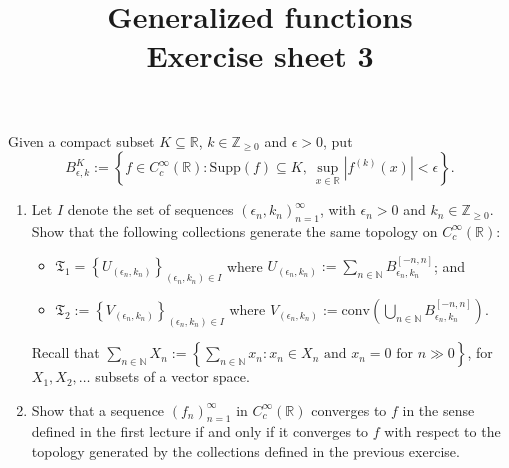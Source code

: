 \documentclass[11pt, reqno,a4paper, twoside]{amsproc}
\title{Generalized functions\\Exercise sheet 3}
\newcommand{\supp}{\mathrm{Supp}}
\newcommand{\dbN}{\mathbb N}
\newcommand{\dbZ}{\mathbb Z}
\newcommand{\dbR}{\mathbb R}
\newcommand{\set}[1]{\left\{{#1}\right\}}
\newcommand{\abs}[1]{\left|#1\right|}
\newcommand{\mfr}{\mathfrak}
\begin{document}
\maketitle

\subsection{}
Given a compact subset $K\subseteq\dbR$, $k\in\dbZ_{\ge 0}$ and $\epsilon>0$, put \[B^K_{\epsilon,k}:=\set{f\in C^\infty_c(\dbR):\supp(f)\subseteq K,\: \sup_{x\in\dbR}\abs{f^{(k)}(x)}<\epsilon}.\]

\begin{enumerate}
	\item Let $I$ denote the set of sequences $(\epsilon_n,k_n)_{n=1}^\infty$, with $\epsilon_n>0$ and $k_n\in\dbZ_{\ge 0}$. Show that the following collections generate the same topology on $C_c^\infty(\dbR)$:
	\begin{itemize}
		\item $\mfr{T}_1=\set{U_{(\epsilon_n,k_n)}}_{(\epsilon_n,k_n)\in I}$ where $U_{(\epsilon_n,k_n)}:=\sum_{n\in\dbN} B^{[-n,n]}_{\epsilon_n,k_n}$; and
		\item $\mfr{T}_2:=\set{V_{(\epsilon_n,k_n)}}_{(\epsilon_n,k_n)\in I}$ where $V_{(\epsilon_n,k_n)}:=\mathrm{conv}\left(\bigcup_{n\in\dbN}B_{\epsilon_n,k_n}^{[-n,n]}\right)$.
	\end{itemize}
	Recall that $\sum_{n\in\dbN}X_n:=\set{\sum_{n\in\dbN}x_n:x_n\in X_n\text{ and $x_n=0$ for }n\gg 0}$, for $X_1,X_2,\ldots$ subsets of a vector space.
	\item Show that a sequence $(f_n)_{n=1}^\infty$ in $C_c^\infty(\dbR)$ converges to $f$ in the sense defined in the first lecture if and only if it converges to $f$ with respect to the topology generated by the collections defined in the previous exercise.
\end{enumerate} 
\end{document}

